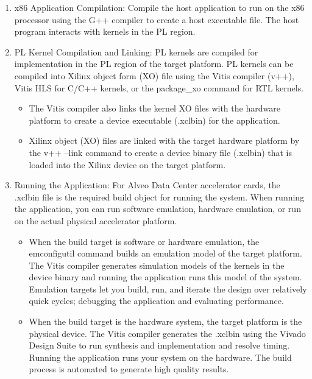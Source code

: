 \begin{enumerate}
    \item x86 Application Compilation: Compile the host application to run on the x86 processor using the G++ compiler to create a host executable file. The host program interacts with kernels in the PL region.
    \item PL Kernel Compilation and Linking: PL kernels are compiled for implementation in the PL region of the target platform. PL kernels can be compiled into Xilinx object form (XO) file using the Vitis compiler (v++), Vitis HLS for C/C++ kernels, or the package\_xo command for RTL
    kernels. 
    \begin{itemize}
        \item The Vitis compiler also links the kernel XO files with the hardware platform to create a device executable (.xclbin) for the application.
        \item Xilinx object (XO) files are linked with the target hardware platform by the v++ --link command to create a device binary file (.xclbin) that is loaded into the Xilinx device on the target platform.
    \end{itemize}

    \item Running the Application: For Alveo Data Center accelerator cards, the .xclbin file is the required build object for running the system. When running the application, you can run software emulation, hardware emulation, or run on the actual physical accelerator platform.

    \begin{itemize}
        \item When the build target is software or hardware emulation, the emconfigutil command builds an emulation model of the target platform. The Vitis compiler generates simulation models of the kernels in the device binary and running the application runs this model of the system. Emulation targets let you build, run, and iterate the design over relatively quick cycles; debugging the application and evaluating performance.
        \item When the build target is the hardware system, the target platform is the physical device. The Vitis compiler generates the .xclbin using the Vivado Design Suite to run synthesis and implementation and resolve timing. Running the application runs your system on the hardware. The build process is automated to generate high quality results. 
    \end{itemize}
\end{enumerate}

